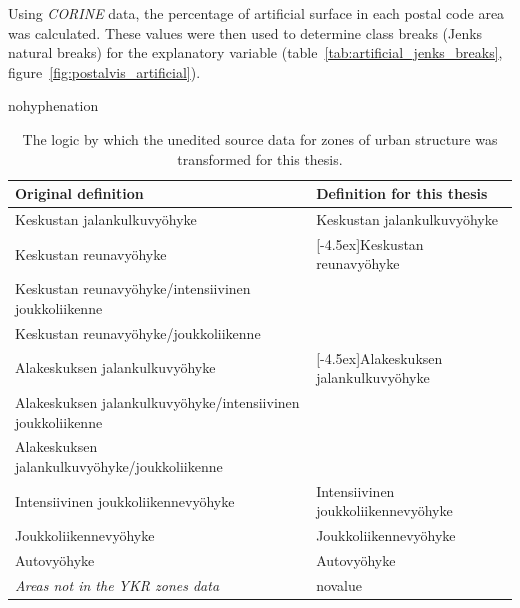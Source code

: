 Using \textit{CORINE} data, the percentage of artificial surface in each postal code area was calculated. These values were then used to determine class breaks (Jenks natural breaks) for the explanatory variable  (table~\ref{tab:artificial_jenks_breaks}, figure~\ref{fig:postalvis_artificial}).

\begin{hyphenrules}{nohyphenation}
    \begin{table}[H]%
        \centering
        \def\arraystretch{1.2}
        \setlength\tabcolsep{1.2ex}
        \caption[YKR zones processing]{The logic by which the unedited source data for zones of urban structure was transformed for this thesis.}
        \label{tab:ykr_zones_simplify}
        \scalebox{0.9}
        {\begin{tabular}{ @{} >{\raggedright\arraybackslash}p{6cm} >{\raggedright\arraybackslash}p{6cm} @{} }
            \toprule
            Original definition & Definition for this thesis \\
            \midrule
            Keskustan jalankulkuvyöhyke & Keskustan jalankulkuvyöhyke \\
            \greyrule
            Keskustan reunavyöhyke & \multirow{3}{*}[-4.5ex]{Keskustan reunavyöhyke} \\
            Keskustan reunavyöhyke/intensiivinen joukkoliikenne & \\
            Keskustan reunavyöhyke/joukkoliikenne & \\
            \greyrule
            Alakeskuksen jalankulkuvyöhyke & \multirow{3}{*}[-4.5ex]{Alakeskuksen jalankulkuvyöhyke} \\
            Alakeskuksen jalankulkuvyöhyke/intensiivinen joukkoliikenne & \\
            Alakeskuksen jalankulkuvyöhyke/joukkoliikenne & \\
            \greyrule
            Intensiivinen joukkoliikennevyöhyke & Intensiivinen joukkoliikennevyöhyke \\ 
            \greyrule
            Joukkoliikennevyöhyke & Joukkoliikennevyöhyke \\
            \greyrule
            Autovyöhyke & Autovyöhyke \\
            \greyrule
            \textit{Areas not in the YKR zones data} & novalue \\
            \bottomrule
        \end{tabular}}
    \end{table} 
\end{hyphenrules}

